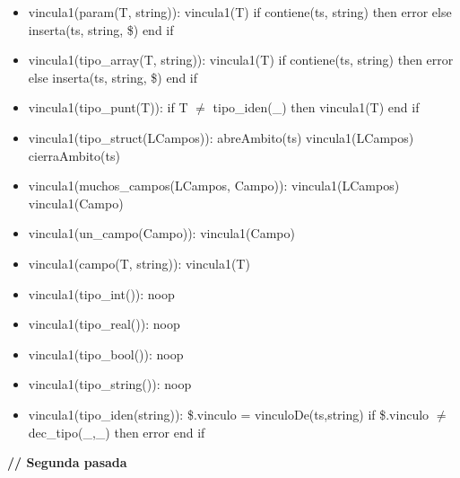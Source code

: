 \documentclass[11pt]{article}
\begin{document}
\begin{itemize}
                \item vincula1(param(T, string)): 
                    \subitem vincula1(T) 
                    \subitem if contiene(ts, string) then 
                        \subsubitem error 
                    \subitem else 
                        \subsubitem inserta(ts, string, \$) 
                    \subitem end if
                \item vincula1(tipo\_array(T, string)): 
                    \subitem vincula1(T) 
                    \subitem if contiene(ts, string) then 
                        \subsubitem error 
                    \subitem else 
                        \subsubitem inserta(ts, string, \$) 
                    \subitem end if
                \item vincula1(tipo\_punt(T)): 
                    \subitem if T $\neq$ tipo\_iden(\_) then 
                        \subsubitem vincula1(T)
                    \subitem end if
                \item vincula1(tipo\_struct(LCampos)): 
                    \subitem abreAmbito(ts)
                    \subitem vincula1(LCampos)
                    \subitem cierraAmbito(ts)
                \item vincula1(muchos\_campos(LCampos, Campo)): 
                    \subitem vincula1(LCampos) 
                    \subitem vincula1(Campo)
                \item vincula1(un\_campo(Campo)): 
                    \subitem vincula1(Campo)
                \item vincula1(campo(T, string)): 
                    \subitem vincula1(T)
                \item vincula1(tipo\_int()): 
                    \subitem noop 
                \item vincula1(tipo\_real()): 
                    \subitem noop
                \item vincula1(tipo\_bool()): 
                    \subitem noop
                \item vincula1(tipo\_string()): 
                    \subitem noop
                \item vincula1(tipo\_iden(string)): 
                    \subitem \$.vinculo = vinculoDe(ts,string)
                    \subitem if \$.vinculo $\neq$ dec\_tipo(\_,\_) then
                        \subsubitem error
                    \subitem end if
            \end{itemize}
            \textbf{\/// Segunda pasada}
\end{document}
